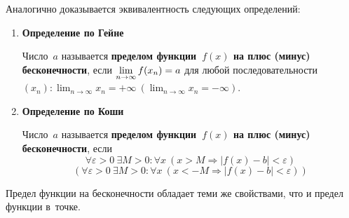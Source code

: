 Аналогично доказывается эквивалентность следующих определений:
\begin{enumerate}
	\item \textbf{Определение по Гейне}
	
	Число~$a$ называется \textbf{пределом функции~$f(x)$ на плюс (минус) бесконечности}, если \allowbreak
	$\displaystyle \lim_{n \to \infty} f(x_n) \opbr= a$ для любой последовательности~$\displaystyle (x_n): \lim_{n \to \infty} x_n = +\infty \ (\lim_{n \to \infty} x_n = -\infty)$.
	
	\item \textbf{Определение по Коши}
	
	Число~$a$ называется \textbf{пределом функции~$f(x)$ на плюс (минус) бесконечности}, если
	\begin{equation*}
	\forall \varepsilon > 0 \ \exists M > 0 \colon \forall x \ (x > M \Rightarrow |f(x) - b| < \varepsilon)
	\end{equation*}
	\begin{equation*}
	(\forall \varepsilon > 0 \ \exists M > 0 \colon \forall x \ (x < -M \Rightarrow |f(x) - b| < \varepsilon))
	\end{equation*}
\end{enumerate}

Предел функции на бесконечности обладает теми же свойствами, что и предел функции в~точке.